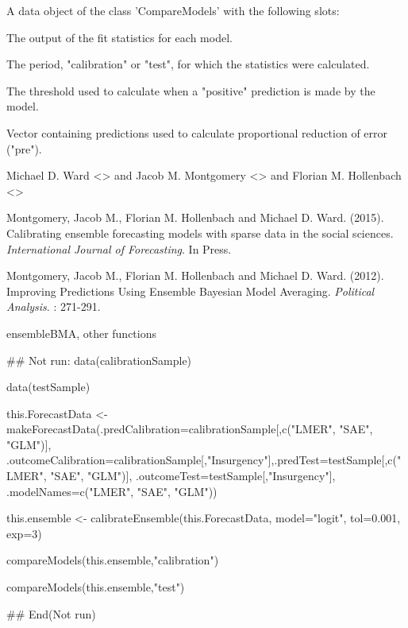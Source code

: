 \documentclass[a4paper]{book}
\begin{document}
%
\begin{Value}
A data object of the class 'CompareModels' with the following slots:
\begin{ldescription}
\item[\code{fitStatistics}] The output of the fit statistics for each model.
\item[\code{period}] The period, "calibration" or "test", for which the statistics were calculated.
\item[\code{threshold}] The threshold used to calculate when a "positive" prediction is made by the model.
\item[\code{baseModel}] Vector containing predictions used to calculate proportional reduction of error ("pre").
\end{ldescription}
\end{Value}
%
\begin{Author}\relax
Michael D. Ward <> and Jacob M. Montgomery <> and Florian M. Hollenbach <>
\end{Author}
%
\begin{References}\relax
Montgomery, Jacob M., Florian M. Hollenbach and Michael D. Ward. (2015). Calibrating ensemble forecasting models with sparse data in the social sciences.   \emph{International Journal of Forecasting}. In Press.

Montgomery, Jacob M., Florian M. Hollenbach and Michael D. Ward. (2012). Improving Predictions Using Ensemble Bayesian Model Averaging. \emph{Political Analysis}. : 271-291.
\end{References}
%
\begin{SeeAlso}\relax
ensembleBMA, other functions
\end{SeeAlso}
%
\begin{Examples}
\begin{ExampleCode}
## Not run: data(calibrationSample)

data(testSample)

this.ForecastData <- makeForecastData(.predCalibration=calibrationSample[,c("LMER", "SAE", "GLM")],
.outcomeCalibration=calibrationSample[,"Insurgency"],.predTest=testSample[,c("LMER", "SAE", "GLM")],
.outcomeTest=testSample[,"Insurgency"], .modelNames=c("LMER", "SAE", "GLM"))

this.ensemble <- calibrateEnsemble(this.ForecastData, model="logit", tol=0.001, exp=3)

compareModels(this.ensemble,"calibration")

compareModels(this.ensemble,"test")

## End(Not run)
\end{ExampleCode}
\end{Examples}
\end{document}
